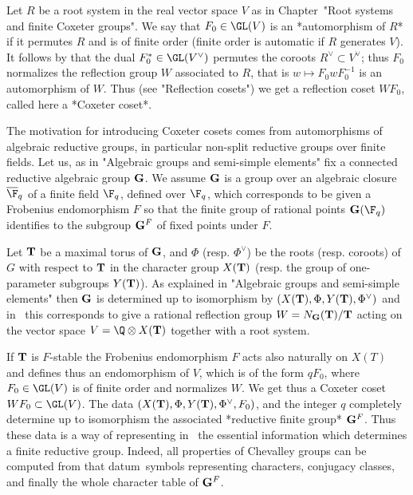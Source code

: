 \def\bB{{\bf B}}
\def\bG{{\bf G}}
\def\bT{{\bf T}}

Let  $R$ be a root system in the  real vector space $V$ as in Chapter~"Root
systems  and  finite  Coxeter  groups".  We  say that $F_0\in \GL(V)$ is an
*automorphism  of $R$* if  it permutes $R$  and is of  finite order (finite
order  is automatic  if $R$  generates $V$).  It follows by \cite[chap. VI,
\S1.1,  lemme 1]{Bou68} that the dual $F_0^\ast\in\GL(V^\vee)$ permutes the
coroots  $R^\vee\subset V^\vee$; thus $F_0$ normalizes the reflection group
$W$  associated to $R$, that is  $w\mapsto F_0wF_0^{-1}$ is an automorphism
of  $W$. Thus (see  "Reflection cosets") we  get a reflection coset $WF_0$,
called here a *Coxeter coset*.

The  motivation for introducing Coxeter  cosets comes from automorphisms of
algebraic  reductive groups, in particular  non-split reductive groups over
finite  fields. Let us,  as in "Algebraic  groups and semi-simple elements"
fix a connected reductive algebraic group $\bG$. We assume $\bG$ is a group
over an algebraic closure $\overline\F_q$ of a finite field $\F_q$, defined
over  $\F_q$, which corresponds to be given a Frobenius endomorphism $F$ so
that  the finite  group of  rational points  $\bG(\F_q)$ identifies  to the
subgroup $\bG^F$ of fixed points under $F$.

Let  $\bT$ be a maximal  torus of $\bG$, and  $\Phi$ (resp. $\Phi^\vee$) be
the  roots (resp. coroots)  of $G$ with  respect to $\bT$  in the character
group  $X(\bT)$ (resp. the  group of one-parameter  subgroups $Y(\bT)$). As
explained  in  "Algebraic  groups  and  semi-simple elements" then $\bG$ is
determined  up  to  isomorphism  by $(X(\bT),\Phi,Y(\bT),\Phi^\vee)$ and in
\CHEVIE\   this   corresponds   to   give   a   rational  reflection  group
$W=N_\bG(\bT)/\bT$ acting on the vector space $V=\Q\otimes X(\bT)$ together
with a root system.

If  $\bT$ is $F$-stable the Frobenius  endomorphism $F$ acts also naturally
on  $X(T)$ and defines thus an endomorphism of $V$, which is of the form $q
F_0$,  where $F_0\in\GL(V)$ is  of finite order  and normalizes $W$. We get
thus  a Coxeter coset $WF_0\subset\GL(V)$. The data $(X(\bT), \Phi, Y(\bT),
\Phi^\vee,   F_0)$,  and  the  integer   $q$  completely  determine  up  to
isomorphism  the associated  *reductive finite  group* $\bG^F$.  Thus these
data  is a way of representing  in \CHEVIE\ the essential information which
determines  a finite reductive  group. Indeed, all  properties of Chevalley
groups  can be computed from that datum\:\ symbols representing characters,
conjugacy classes, and finally the whole character table of $\bG^F$.

